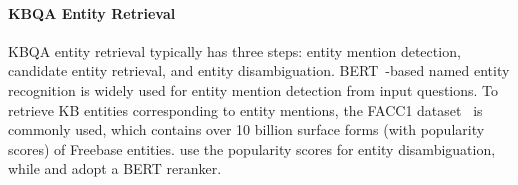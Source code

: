  \paragraph{KBQA Entity Retrieval}%
KBQA entity retrieval typically has three steps: {entity mention detection}, {candidate entity retrieval}, and {entity disambiguation}. BERT~\cite{devlin_bert_2019}-based named entity recognition  is widely used for entity mention detection from input questions. %
To retrieve KB entities corresponding to entity mentions, the FACC1 dataset~\cite{gabrilovich_facc1_2013} is commonly used, which contains over 10 billion surface forms (with popularity scores) of Freebase entities. \citet{gu_beyond_2021} use the popularity scores for entity disambiguation, while \citet{ye_rng-kbqa_2022} and \citet{shu_tiara_2022} adopt a BERT reranker. %

